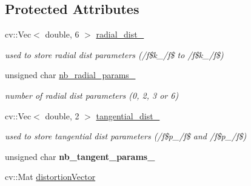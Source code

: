 \subsection*{Protected Attributes}
\begin{DoxyCompactItemize}
\item 
\hypertarget{class_opencv_sf_m_1_1_camera_pinhole_distor_ad3b352db4b127864bcd901e11d7e50dc}{
cv::Vec$<$ double, 6 $>$ \hyperlink{class_opencv_sf_m_1_1_camera_pinhole_distor_ad3b352db4b127864bcd901e11d7e50dc}{radial\_\-dist\_\-}}
\label{class_opencv_sf_m_1_1_camera_pinhole_distor_ad3b352db4b127864bcd901e11d7e50dc}

\begin{DoxyCompactList}\small\item\em used to store radial dist parameters (/f\$k\_/f\$ to /f\$k\_/f\$) \end{DoxyCompactList}\item 
\hypertarget{class_opencv_sf_m_1_1_camera_pinhole_distor_a99247804700d8c8bfaf50a4e84cfb080}{
unsigned char \hyperlink{class_opencv_sf_m_1_1_camera_pinhole_distor_a99247804700d8c8bfaf50a4e84cfb080}{nb\_\-radial\_\-params\_\-}}
\label{class_opencv_sf_m_1_1_camera_pinhole_distor_a99247804700d8c8bfaf50a4e84cfb080}

\begin{DoxyCompactList}\small\item\em number of radial dist parameters (0, 2, 3 or 6) \end{DoxyCompactList}\item 
\hypertarget{class_opencv_sf_m_1_1_camera_pinhole_distor_ae09ea3c12a8e19788d084b357f11a902}{
cv::Vec$<$ double, 2 $>$ \hyperlink{class_opencv_sf_m_1_1_camera_pinhole_distor_ae09ea3c12a8e19788d084b357f11a902}{tangential\_\-dist\_\-}}
\label{class_opencv_sf_m_1_1_camera_pinhole_distor_ae09ea3c12a8e19788d084b357f11a902}

\begin{DoxyCompactList}\small\item\em used to store tangential dist parameters (/f\$p\_/f\$ and /f\$p\_/f\$) \end{DoxyCompactList}\item 
\hypertarget{class_opencv_sf_m_1_1_camera_pinhole_distor_a80906d90106b91c391449d4cb9fd32e7}{
unsigned char {\bfseries nb\_\-tangent\_\-params\_\-}}
\label{class_opencv_sf_m_1_1_camera_pinhole_distor_a80906d90106b91c391449d4cb9fd32e7}

\item 
\hypertarget{class_opencv_sf_m_1_1_camera_pinhole_distor_af9ce33321472dbbb71668b266225060b}{
cv::Mat \hyperlink{class_opencv_sf_m_1_1_camera_pinhole_distor_af9ce33321472dbbb71668b266225060b}{distortionVector}}
\label{class_opencv_sf_m_1_1_camera_pinhole_distor_af9ce33321472dbbb71668b266225060b}


\end{DoxyCompactItemize}
